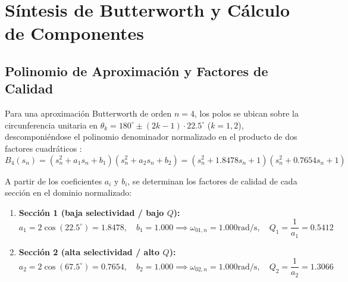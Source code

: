 \section{Síntesis de Butterworth y Cálculo de Componentes}

\subsection{Polinomio de Aproximación y Factores de Calidad}
Para una aproximación Butterworth de orden $n = 4$, los polos se ubican sobre la circunferencia unitaria en $\theta_k =
180^\circ \pm (2k - 1) \cdot 22.5^\circ$ ($k = 1, 2$), descomponiéndose el polinomio denominador normalizado en el
producto de dos factores cuadráticos \cite{pactitis2001}:
\begin{equation}
    B_4(s_n) = (s_n^2 + a_1 s_n + b_1)(s_n^2 + a_2 s_n + b_2) = (s_n^2 + 1.8478 s_n + 1)(s_n^2 + 0.7654 s_n + 1)
\end{equation}

A partir de los coeficientes $a_i$ y $b_i$, se determinan los factores de calidad de cada sección en el dominio
normalizado:
\begin{enumerate}
    \item \textbf{Sección 1 (baja selectividad / bajo $Q$):}
        \begin{equation*}
            a_1 = 2\cos(22.5^\circ) = 1.8478, \quad b_1 = 1.000 \implies \omega_{01,n} = 1.000 \unit{\radian\per\second}, \quad Q_1 = \frac{1}{a_1} = 0.5412
        \end{equation*}
    \item \textbf{Sección 2 (alta selectividad / alto $Q$):}
        \begin{equation*}
            a_2 = 2\cos(67.5^\circ) = 0.7654, \quad b_2 = 1.000 \implies \omega_{02,n} = 1.000 \unit{\radian\per\second}, \quad Q_2 = \frac{1}{a_2} = 1.3066
        \end{equation*}
\end{enumerate}

